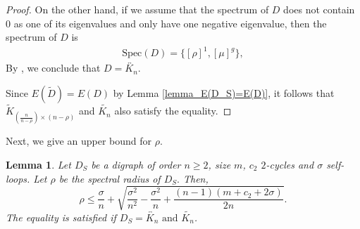 \documentclass[12pt,a4paper,reqno]{amsart}
\numberwithin{equation}{section}
\theoremstyle{plain}
\newtheorem{lemma}[theorem]{Lemma}
\theoremstyle{definition}
\newcommand{\<}{\langle}
\renewcommand{\>}{\rangle}
\begin{document}
\begin{proof}

        On the other hand, if we assume that the spectrum of $D$ does not contain $0$ as one of its eigenvalues and only have one negative eigenvalue, then the spectrum of $D$ is 
            \begin{align*}
                     \mathrm{Spec}(D) =\{[\rho]^1, [\mu]^g \},
            \end{align*}
        By \cite[Theorem 6.4]{cvetkovic1995spectra}, we conclude that $D= \overleftrightarrow{K_{n}}$.

         Since $E(\widetilde{D})=E(D)$ by Lemma \ref{lemma_E(D_S)=E(D)}, it follows that $\widetilde{K}_{(\frac{n}{n-\rho}) \times (n-\rho)}$ and $\widetilde{K_n}$ also satisfy the equality.
    \end{proof}
    
    Next, we give an upper bound for $\rho$. 
    \begin{lemma}
        \label{lemma_ub_rho}
        Let $D_S$ be a digraph of order $n\geq2$, size $m$, $c_2$ $2$-cycles and $\sigma$ self-loops. Let $\rho$ be the spectral radius of $D_S.$ Then, 
        $$\rho \leq \frac{\sigma}{n} + \sqrt{\frac{\sigma^2}{n^2}-\frac{\sigma^2}{n}+\frac{(n-1)(m+c_2+2\sigma)}{2n}}.$$
        The equality is satisfied if $D_S=\overleftrightarrow{K_n} \text{ and } \widetilde{K_n}$.
    \end{lemma}
\end{document}
